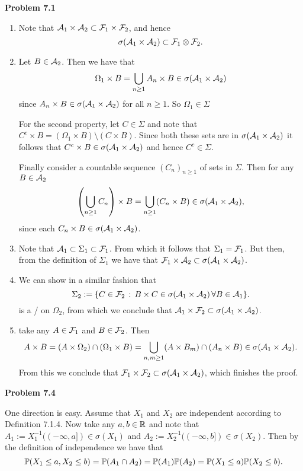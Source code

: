    
\textbf{Problem 7.1}
\begin{enumerate}[label={(\alph*)}]
\item Note that $\mathcal A_1 \times \mathcal A_2 \subset \mathcal F_1 \times \mathcal F_2$, and hence
\[
	\sigma(\mathcal A_1 \times \mathcal A_2) \subset \mathcal F_1 \otimes \mathcal F_2.
\]
\item Let $B \in \mathcal A_2$. Then we have that
\[
	\Omega_1 \times B = \bigcup_{n \ge 1} A_n \times B \in \sigma(\mathcal A_1 \times \mathcal A_2) 
\]
since $A_n \times B \in \sigma(\mathcal A_1 \times \mathcal A_2)$ for all $n \ge 1$. So $\Omega_1 \in \Sigma$

For the second property, let $C \in \Sigma$ and note that $C^c \times B = (\Omega_1 \times B) \setminus (C \times B)$.
Since both these sets are in $\sigma(\mathcal A_1 \times \mathcal A_2)$ it follows that $C^c \times B \in \sigma(\mathcal A_1 \times \mathcal A_2)$ and hence $C^c \in \Sigma$.

Finally consider a countable sequence $(C_n)_{n \ge 1}$ of sets in $\Sigma$. Then for any $B \in \mathcal A_2$
\[
	\left(\bigcup_{n \ge 1} C_n \right) \times B = \bigcup_{n \ge 1} (C_n \times B) \in \sigma(\mathcal A_1 \times \mathcal A_2),
\]
since each $C_n \times B \in \sigma(\mathcal A_1 \times \mathcal A_2)$.
\item Note that $\mathcal A_1 \subset \Sigma_1 \subset \mathcal F_1$. From which it follows that $\Sigma_1 = \mathcal F_1$. But then, from the definition of $\Sigma_1$ we have that $\mathcal F_1 \times \mathcal A_2 \subset \sigma(\mathcal A_1 \times \mathcal A_2)$.
\item We can show in a similar fashion that
\[
	\Sigma_2 := \{C \in \mathcal F_2 \, : \, B \times C \in \sigma(\mathcal A_1 \times \mathcal A_2) \, \forall B \in \mathcal A_1\}.
\]
is a \sigalg/ on $\Omega_2$, from which we conclude that $\mathcal A_1 \times \mathcal F_2 \subset \sigma(\mathcal A_1 \times \mathcal A_2)$.
\item take any $A \in \mathcal F_1$ and $B \in \mathcal F_2$. Then
\[
	A \times B = (A \times \Omega_2) \cap (\Omega_1 \times B) = \bigcup_{n,m \ge 1} (A \times B_m) \cap (A_n \times B) \in \sigma(\mathcal A_1 \times \mathcal A_2).
\]
From this we conclude that $\mathcal F_1 \times \mathcal F_2 \subset \sigma(\mathcal A_1 \times \mathcal A_2)$, which finishes the proof.
\end{enumerate}

\bigskip
\textbf{Problem 7.4}

One direction is easy. Assume that $X_1$ and $X_2$ are independent according to Definition 7.1.4. Now take any $a,b \in \mathbb R$ and note that $A_1 := X_1^{-1}((-\infty,a]) \in \sigma(X_1)$ and $A_2 := X_2^{-1}((-\infty, b]) \in \sigma(X_2)$. Then by the definition of independence we have that
\[
	\mathbb{P}(X_1 \le a, X_2 \le b) = \mathbb P(A_1 \cap A_2) = \mathbb P(A_1) \mathbb P(A_2) = \mathbb{P}(X_1 \le a) \mathbb{P}(X_2 \le b).
\]

